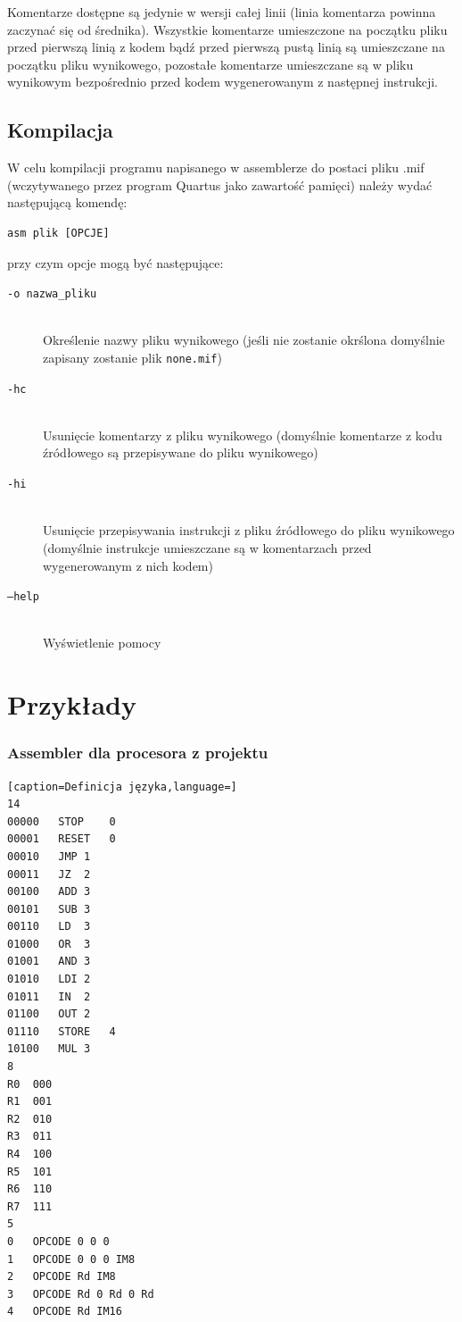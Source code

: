 \documentclass[a4paper,12pt]{report}
\begin{document}
Komentarze dostępne są jedynie w wersji całej linii (linia komentarza powinna zaczynać się od średnika). Wszystkie komentarze umieszczone na początku pliku przed pierwszą linią z kodem bądź przed pierwszą pustą linią są umieszczane na początku pliku wynikowego, pozostałe komentarze umieszczane są w pliku wynikowym bezpośrednio przed kodem wygenerowanym z następnej instrukcji.

\subsection{Kompilacja}

W celu kompilacji programu napisanego w assemblerze do postaci pliku .mif (wczytywanego przez program Quartus jako zawartość pamięci) należy wydać następującą komendę:

\begin{verbatim}
asm plik [OPCJE]
\end{verbatim}

przy czym opcje mogą być następujące:

\begin{description}
\item[\tt{-o nazwa\_pliku}] \hfill \\
Określenie nazwy pliku wynikowego (jeśli nie zostanie okrślona domyślnie zapisany zostanie plik \verb|none.mif|)
\item[\tt{-hc}] \hfill \\
Usunięcie komentarzy z pliku wynikowego (domyślnie komentarze z kodu źródłowego są przepisywane do pliku wynikowego)
\item[\tt{-hi}] \hfill \\
Usunięcie przepisywania instrukcji z pliku źródłowego do pliku wynikowego (domyślnie instrukcje umieszczane są w komentarzach przed wygenerowanym z nich kodem)
\item[\tt{--help}] \hfill \\
Wyświetlenie pomocy
\end{description}

\section{Przykłady}

\label{sec:asmex}
\subsubsection{Assembler dla procesora z projektu}
\lstset{
tabsize=6
}
\begin{lstlisting}[caption=Definicja języka,language=]
14
00000	STOP	0
00001	RESET	0
00010	JMP	1
00011	JZ	2
00100	ADD	3
00101	SUB	3
00110	LD	3
01000	OR	3
01001	AND	3
01010	LDI	2
01011	IN	2
01100	OUT	2
01110	STORE	4
10100	MUL	3
8
R0	000
R1	001
R2	010
R3	011
R4	100
R5	101
R6	110
R7	111
5
0	OPCODE 0 0 0
1	OPCODE 0 0 0 IM8
2	OPCODE Rd IM8
3	OPCODE Rd 0 Rd 0 Rd
4	OPCODE Rd IM16
\end{lstlisting}
\end{document}
